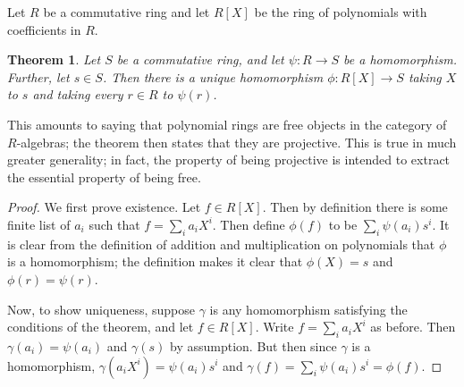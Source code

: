 \documentclass[12pt]{article}
\newtheorem{theorem}{Theorem}
\begin{document}
Let $R$ be a commutative ring and let $R[X]$ be the ring of polynomials with coefficients in $R$. 

\begin{theorem}
Let $S$ be a commutative ring, and let $\psi\colon R\to S$ be a homomorphism.  Further, let $s\in S$.  Then there is a unique homomorphism $\phi\colon R[X]\to S$ taking $X$ to $s$ and taking every $r\in R$ to $\psi(r)$. 
\end{theorem}

This amounts to saying that polynomial rings are free objects in the category of $R$-algebras; the theorem then states that they are projective.  This is true in much greater generality; in fact, the property of being projective is intended to extract the essential property of being free.

\begin{proof}
We first prove existence.  Let $f\in R[X]$.  Then by definition there is some finite list of $a_i$ such that $f = \sum_i a_i X^i$.  Then define $\phi(f)$ to be $\sum_i \psi(a_i) s^i$.  It is clear from the definition of addition and multiplication on polynomials that $\phi$ is a homomorphism; the definition makes it clear that $\phi(X)=s$ and $\phi(r)=\psi(r)$. 

Now, to show uniqueness, suppose $\gamma$ is any homomorphism satisfying the conditions of the theorem, and let $f\in R[X]$.  Write $f = \sum_i a_i X^i$ as before.  Then $\gamma(a_i) = \psi(a_i)$ and $\gamma(s)$ by assumption.  But then since $\gamma$ is a homomorphism, $\gamma(a_iX^i) = \psi(a_i)s^i$ and $\gamma(f) = \sum_i \psi(a_i) s^i = \phi(f)$.
\end{proof}
\end{document}
